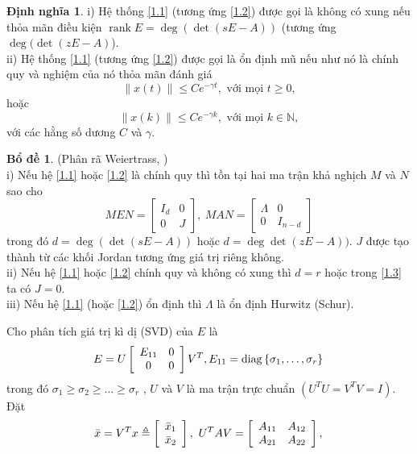 \documentclass[12pt,a4paper]{report}
\theoremstyle{definition}
\newtheorem{lemma}{Bổ đề}
\theoremstyle{definition}
\newtheorem{dn}{Định nghĩa}
\numberwithin{dl}{chapter}
\numberwithin{vd}{chapter}
\numberwithin{corollary}{chapter}
\numberwithin{lemma}{chapter}
\numberwithin{md}{chapter}
\numberwithin{dn}{chapter}
\numberwithin{cy}{chapter}
\numberwithin{nx}{chapter}
\begin{document}
\begin{dn} 
i) Hệ thống \eqref{1.1} (tương ứng \eqref{1.2}) được gọi là không có xung nếu thỏa mãn điều kiện $\operatorname{rank} E=\operatorname{deg}(\det(sE-A))$ (tương ứng $\operatorname{deg}(\det(zE-A)$). \\
ii) Hệ thống \eqref{1.1} (tương ứng \eqref{1.2}) được gọi là ổn định mũ nếu như nó là chính quy và nghiệm của nó thỏa mãn đánh giá
%
\[
\|x(t)\| \leq Ce^{-\gamma t}, \mbox { với mọi } t\geq 0,
\]
%
hoặc 
%
\[
\|x(k)\| \leq Ce^{-\gamma k}, \mbox { với mọi } k \in \mathbb{N},
\]
%
với các hằng số dương $C$ và $\gamma$.
\end{dn}


\begin{lemma}\label{bd1.1} (Phân rã Weiertrass, \cite{LTW11}) \\
i) Nếu hệ \eqref{1.1} hoặc \eqref{1.2} là chính quy thì tồn tại hai ma trận khả nghịch  $M$ và $N$ sao cho 
%
\begin{equation}\label{1.3}
M E N=\left[\begin{array}{cc}I_{d} & 0 \\ 0 & J\end{array}\right],\ M A N=\left[\begin{array}{cc}\Lambda & 0 \\ 0 & I_{n-d}\end{array}\right]
\end{equation}
%
trong đó $d=\operatorname{deg}(\det(sE-A))$ hoặc $d=\operatorname{deg}\det(zE-A))$. $J$ được tạo thành từ các khối Jordan tương ứng giá trị riêng không.\\
ii) Nếu hệ \eqref{1.1} hoặc \eqref{1.2} chính quy và không có xung thì $d=r$ hoặc trong \eqref{1.3} ta có $J=0$. \\
iii) Nếu hệ \eqref{1.1} (hoặc \eqref{1.2}) ổn định thì $\Lambda$ là ổn định Hurwitz (Schur).
\end{lemma}
Cho phân tích giá trị kì dị (SVD) của $E$ là
\begin{equation}\label{1.4}
E=U\left[\begin{array}{cc}
E_{11} & 0 \\
0 & 0
\end{array}\right] V^{T}, E_{11}=\operatorname{diag}\left\{\sigma_{1}, \ldots, \sigma_{r}\right\} \\
\end{equation}
trong đó $\sigma_{1} \geq \sigma_{2 } \geq \ldots \geq \sigma_{r}$ , $U$ và $V$ là ma trận trực chuẩn $\left(U^{T} U=V^{T} V=I\right)$. Đặt
\begin{equation}\label{1.5}
\bar{x}=V^{T} x \triangleq\left[\begin{array}{c}
\bar{x}_{1} \\
\bar{x}_{2}
\end{array}\right],\ U^{T} A V=\left[\begin{array}{ll}
A_{11} & A_{12} \\
A_{21} & A_{22}
\end{array}\right], \\
\end{equation}
\end{document}
